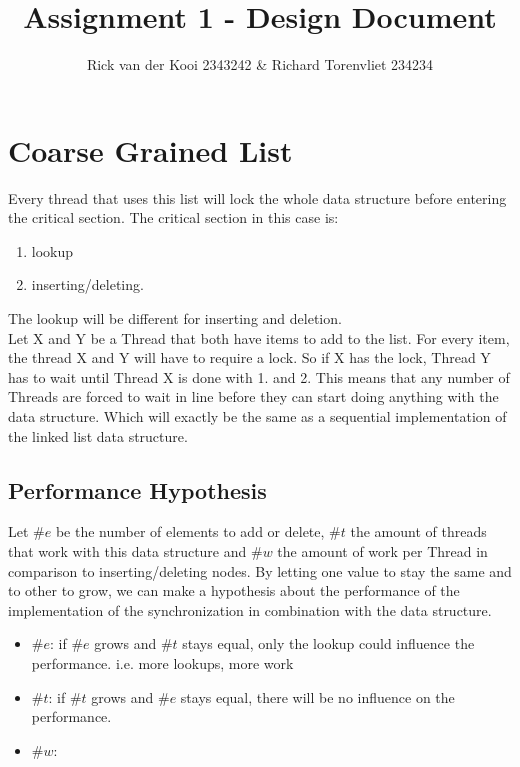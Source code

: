\documentclass[10pt,a4paper]{article}
\author{Rick van der Kooi 2343242 \& Richard Torenvliet 234234}
\title{Assignment 1 - Design Document}
\begin{document}
\maketitle

\section{Coarse Grained List}
    Every thread that uses this list will lock the
    whole data structure before entering the critical section.
    The critical section in this case is: 
        \begin{enumerate}
        \item lookup
        \item inserting/deleting.
        \end{enumerate}
    The lookup will be different for inserting and deletion.
    \\
    Let X and Y be a Thread that both have items to add to the list. For every
    item, the thread X and Y will have to require a lock. So
    if X has the lock, Thread Y has to wait until Thread X is 
    done with 1. and 2.
    This means that any number of Threads are forced to wait in line before they can start
    doing anything with the data structure. Which will exactly be the same
    as a sequential implementation of the linked list data structure.

\subsection{Performance Hypothesis}
Let $\#e$ be the number of elements to add or delete, $\#t$ the amount of threads
that work with this data structure and $\#w$ the amount of work per Thread in
comparison to inserting/deleting nodes. By letting one value to stay the same
and to other to grow, we can make a hypothesis about the performance of the
implementation of the synchronization in combination with the data structure.
\begin{itemize}
\item $\#e$: if $\#e$ grows and $\#t$ stays equal, only the lookup could influence the performance.
    i.e. more lookups, more work
 \item $\#t$: if $\#t$ grows and $\#e$ stays equal, there will be no influence on the performance.
 \item $\#w$: 
\end{itemize}
\end{document}
